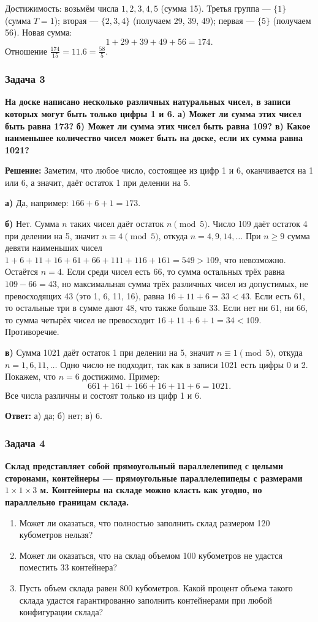 \documentclass[12pt, a4paper]{article}
\begin{document}
Достижимость: возьмём числа \(1, 2, 3, 4, 5\) (сумма 15). Третья группа — \(\{1\}\) (сумма \(T=1\)); вторая — \(\{2, 3, 4\}\) (получаем 29, 39, 49); первая — \(\{5\}\) (получаем 56). Новая сумма:
\[
1 + 29 + 39 + 49 + 56 = 174.
\]
Отношение \(\frac{174}{15} = 11.6 = \frac{58}{5}\).

\subsubsection*{Задача 3}
\textbf{На доске написано несколько различных натуральных чисел, в записи которых могут быть только цифры 1 и 6.}
\textbf{а) Может ли сумма этих чисел быть равна 173?}
\textbf{б) Может ли сумма этих чисел быть равна 109?}
\textbf{в) Какое наименьшее количество чисел может быть на доске, если их сумма равна 1021?}

\textbf{Решение:}
Заметим, что любое число, состоящее из цифр 1 и 6, оканчивается на 1 или 6, а значит, даёт остаток 1 при делении на 5.

\textbf{а)} Да, например: \(166 + 6 + 1 = 173\).

\textbf{б)} Нет. Сумма \(n\) таких чисел даёт остаток \(n \pmod{5}\). Число 109 даёт остаток 4 при делении на 5, значит \(n \equiv 4 \pmod{5}\), откуда \(n = 4, 9, 14, \ldots\)
При \(n \ge 9\) сумма девяти наименьших чисел \(1+6+11+16+61+66+111+116+161 = 549 > 109\), что невозможно.
Остаётся \(n=4\). Если среди чисел есть 66, то сумма остальных трёх равна \(109-66=43\), но максимальная сумма трёх различных чисел из допустимых, не превосходящих 43 (это 1, 6, 11, 16), равна \(16+11+6=33 < 43\). Если есть 61, то остальные три в сумме дают 48, что также больше 33. Если нет ни 61, ни 66, то сумма четырёх чисел не превосходит \(16+11+6+1=34 < 109\). Противоречие.

\textbf{в)} Сумма 1021 даёт остаток 1 при делении на 5, значит \(n \equiv 1 \pmod{5}\), откуда \(n = 1, 6, 11, \ldots\)
Одно число не подходит, так как в записи 1021 есть цифры 0 и 2.
Покажем, что \(n=6\) достижимо. Пример:
\[
661 + 161 + 166 + 16 + 11 + 6 = 1021.
\]
Все числа различны и состоят только из цифр 1 и 6.

\textbf{Ответ:} а) да; б) нет; в) 6.

\subsubsection*{Задача 4}
\textbf{Склад представляет собой прямоугольный параллелепипед с целыми сторонами, контейнеры — прямоугольные параллелепипеды с размерами $1 \times 1 \times 3$ м. Контейнеры на складе можно класть как угодно, но параллельно границам склада.}
\begin{enumerate}[label=\alph*)]
    \item Может ли оказаться, что полностью заполнить склад размером 120 кубометров нельзя?
    \item Может ли оказаться, что на склад объемом 100 кубометров не удастся поместить 33 контейнера?
    \item Пусть объем склада равен 800 кубометров. Какой процент объема такого склада удастся гарантированно заполнить контейнерами при любой конфигурации склада?
\end{enumerate}
\end{document}
